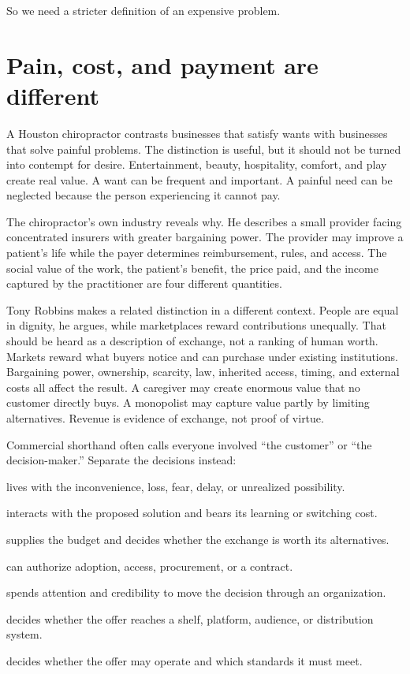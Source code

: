 So we need a stricter definition of an expensive problem.

\section{Pain, cost, and payment are different}

A Houston chiropractor contrasts businesses that satisfy wants with businesses
that solve painful problems. The distinction is useful, but it should not be
turned into contempt for desire. Entertainment, beauty, hospitality, comfort,
and play create real value. A want can be frequent and important. A painful
need can be neglected because the person experiencing it cannot pay.

The chiropractor's own industry reveals why. He describes a small provider
facing concentrated insurers with greater bargaining power. The provider may
improve a patient's life while the payer determines reimbursement, rules, and
access. The social value of the work, the patient's benefit, the price paid,
and the income captured by the practitioner are four different quantities.

Tony Robbins makes a related distinction in a different context. People are
equal in dignity, he argues, while marketplaces reward contributions unequally.
That should be heard as a description of exchange, not a ranking of human
worth. Markets reward what buyers notice and can purchase under existing
institutions. Bargaining power, ownership, scarcity, law, inherited access,
timing, and external costs all affect the result. A caregiver may create
enormous value that no customer directly buys. A monopolist may capture value
partly by limiting alternatives. Revenue is evidence of exchange, not proof of
virtue.

Commercial shorthand often calls everyone involved ``the customer'' or ``the
decision-maker.'' Separate the decisions instead:

\begin{description}[leftmargin=2.4em,style=nextline]
\item[The affected person] lives with the inconvenience, loss, fear, delay, or
  unrealized possibility.
\item[The user] interacts with the proposed solution and bears its learning or
  switching cost.
\item[The payer] supplies the budget and decides whether the exchange is worth
  its alternatives.
\item[The approver] can authorize adoption, access, procurement, or a contract.
\item[The champion] spends attention and credibility to move the decision
  through an organization.
\item[The retailer or channel] decides whether the offer reaches a shelf,
  platform, audience, or distribution system.
\item[The regulator or professional authority] decides whether the offer may
  operate and which standards it must meet.
\end{description}

